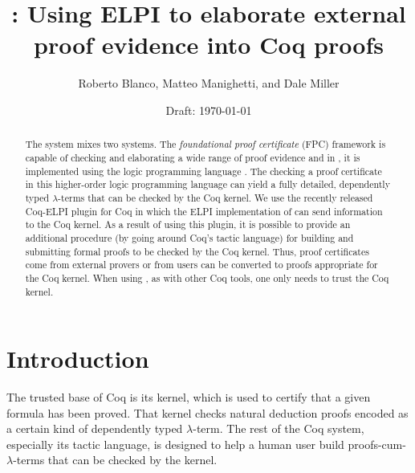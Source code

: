 \documentclass{llncs}
\begin{document}
\title{\fpccoq: Using ELPI to elaborate external proof evidence into Coq proofs}

\author{Roberto Blanco, Matteo Manighetti, and Dale Miller}
\date{Draft: \today}

\maketitle

\begin{abstract}
The \fpccoq system mixes two systems.
%
The \emph{foundational proof certificate} (FPC) framework is capable
of checking and elaborating a wide range of proof evidence and in
\fpccoq, it is implemented using the logic programming language \lP.
%
The checking a proof certificate in this higher-order logic
programming language can yield a fully detailed, dependently
typed $\lambda$-terms that can be checked by the Coq kernel.
%
We use the recently released Coq-ELPI plugin for Coq in which the ELPI
implementation of \lP can send information to the Coq kernel.
%
As a result of using this plugin, it is possible to provide an
additional procedure (by going around Coq's tactic language) for
building and submitting formal proofs to be checked by the Coq
kernel.
%
Thus, proof certificates come from external provers or from
users can be converted to proofs appropriate for the Coq kernel.
%
When using \fpccoq, as with other Coq tools, 
one only needs to trust the Coq kernel. 
\end{abstract}


\section{Introduction}

The trusted base of Coq is its kernel, which is used to certify that a
given formula has been proved.
%
That kernel checks natural deduction proofs encoded as a certain kind
of dependently typed $\lambda$-term.
%
The rest of the Coq system, especially its tactic language, is
designed to help a human user build proofs-cum-$\lambda$-terms that
can be checked by the kernel.

\end{document}
